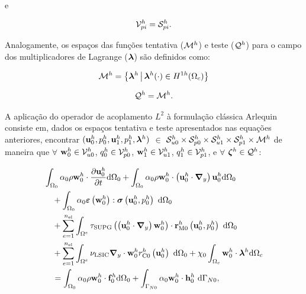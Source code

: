 \noindent e

\begin{align}
	\mathcal{V}_{pi}^h = \mathcal{S}_{pi}^h.
\end{align}

Analogamente, os espaços das funções tentativa ($\mathcal{M}^h$) e teste ($\mathcal{Q}^h$) para o campo dos multiplicadores de Lagrange ($\boldsymbol{\lambda}$) são definidos como:

\begin{align}
	\mathcal{M}^h = \left\{ \boldsymbol{\lambda}^{h} \,\middle|\, \boldsymbol{\lambda}^{h}(\cdot) \in H^{1h}(\Omega_c) \right\}
\end{align}

\begin{align}
	\mathcal{Q}^h = \mathcal{M}^h.
\end{align}

A aplicação do operador de acoplamento $L^{2}$ à formulação clássica Arlequin consiste em, dados os espaços tentativa e teste apresentados nas equações anteriores, encontrar $(\mathbf{u}_0^h,p_0^h,\mathbf{u}_1^h,p_1^h,\boldsymbol{\lambda}^h)$ $\in$ $\mathcal{S}_{u0}^h \times \mathcal{S}_{p0}^h \times \mathcal{S}_{u1}^h \times \mathcal{S}_{p1}^h \times \mathcal{M}^h$ de maneira que  $\forall$ $\mathbf{w}_0^h \in \mathcal{V}_{u0}^h$, $q_0^h \in \mathcal{V}_{p0}^h$, $\mathbf{w}_1^h \in \mathcal{V}_{u1}^h$, $q_1^h \in \mathcal{V}_{p1}^h$, e $\forall$ $\boldsymbol{\zeta}^h \in \mathcal{Q}^h$:

\begin{align}
	\begin{split}
		&\int_{\globalModel} \arlequinWFGlobal \density \wglobalh \cdot \frac{\partial\uglobalh}{\partial t} \deriv \globalModel +
		\int_{\globalModel} \arlequinWFGlobal \density \wglobalh \cdot  \left(\uglobalh \cdot \gradient \right) \uglobalh \deriv \globalModel  \\ 
		&\quad+	
		\int_{\globalModel} \arlequinWFGlobal \straintensor \left(\wglobalh\right) : \stressTensor \left(\uglobalh,\pglobalh\right)\ \deriv \globalModel \\
		&\quad+ \sum_{e=1}^{\nel} \int_{\domainE} \SUPG  \left(\left(\uglobalh \cdot \gradient \right) \wglobalh\right) \cdot \resMomGlobal\left(\uglobalh,\pglobalh \right)\  \deriv \globalModel \\ 
		&\quad+\sum_{e=1}^{\nel} \int_{\domainE} \LSIC \divergence \cdot \wglobalh \resPreGlobal 
		 \left(\uglobalh\right)\  \deriv \globalModel 
		 + \chi_{0} \int_{\gluingZone} \wglobalh \cdot \lagrangeMultiplierh \deriv \gluingZone   \\ 
		 &\quad = \int_{\globalModel} \arlequinWFGlobal \density \wglobalh \cdot  \globalsbodyforceh \deriv \globalModel + \int_{\globalBoundaryN} \arlequinWFGlobal \wglobalh  \cdot \globalSurfaceLoadh\ \deriv \globalBoundaryN,
		\label{eq:QM_forma_fraca_0}
	\end{split}
\end{align}

